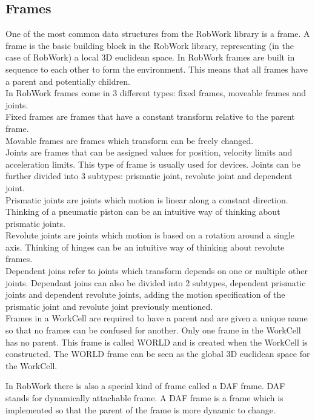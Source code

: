 \subsection{Frames}
One of the most common data structures from the RobWork library is a frame. A frame is the basic building block in the RobWork library, representing (in the case of RobWork) a local 3D euclidean space. In RobWork frames are built in sequence to each other to form the environment. This means that all frames have a parent and potentially children.\\

In RobWork frames come in 3 different types: fixed frames, moveable frames and joints.\\
Fixed frames are frames that have a constant transform relative to the parent frame.\\
Movable frames are frames which transform can be freely changed.\\
Joints are frames that can be assigned values for position, velocity limits and acceleration limits. This type of frame is usually used for devices. Joints can be further divided into 3 subtypes: prismatic joint, revolute joint and dependent joint.\\
Prismatic joints are joints which motion is linear along a constant direction. Thinking of a pneumatic piston can be an intuitive way of thinking about prismatic joints.\\
Revolute joints are joints which motion is based on a rotation around a single axis. Thinking of hinges can be an intuitive way of thinking about revolute frames.\\
Dependent joins refer to joints which transform depends on one or multiple other joints. Dependant joins can also be divided into 2 subtypes, dependent prismatic joints and dependent revolute joints, adding the motion specification of the prismatic joint and revolute joint previously mentioned.\\

Frames in a WorkCell are required to have a parent and are given a unique name so that no frames can be confused for another. Only one frame in the WorkCell has no parent. This frame is called WORLD and is created when the WorkCell is constructed. The WORLD frame can be seen as the global 3D euclidean space for the WorkCell.

In RobWork there is also a special kind of frame called a DAF frame. DAF stands for dynamically attachable frame. A DAF frame is a frame which is implemented so that the parent of the frame is more dynamic to change.

